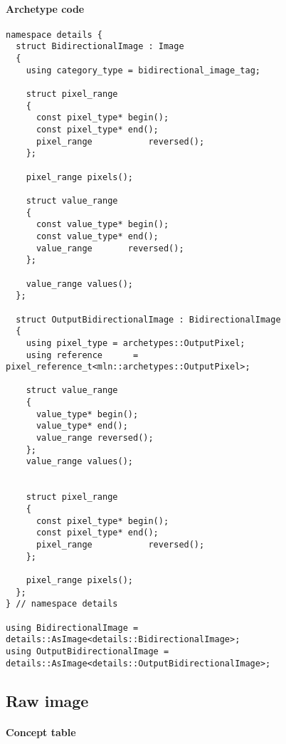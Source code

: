 \paragraph{Archetype code}

\begin{verbatim}
namespace details {
  struct BidirectionalImage : Image
  {
    using category_type = bidirectional_image_tag;

    struct pixel_range
    {
      const pixel_type* begin();
      const pixel_type* end();
      pixel_range           reversed();
    };

    pixel_range pixels();

    struct value_range
    {
      const value_type* begin();
      const value_type* end();
      value_range       reversed();
    };

    value_range values();
  };

  struct OutputBidirectionalImage : BidirectionalImage
  {
    using pixel_type = archetypes::OutputPixel;
    using reference      = pixel_reference_t<mln::archetypes::OutputPixel>;

    struct value_range
    {
      value_type* begin();
      value_type* end();
      value_range reversed();
    };
    value_range values();


    struct pixel_range
    {
      const pixel_type* begin();
      const pixel_type* end();
      pixel_range           reversed();
    };

    pixel_range pixels();
  };
} // namespace details

using BidirectionalImage = details::AsImage<details::BidirectionalImage>;
using OutputBidirectionalImage = details::AsImage<details::OutputBidirectionalImage>;
\end{verbatim}


\clearpage

\subsection{Raw image}

\paragraph{Concept table}

